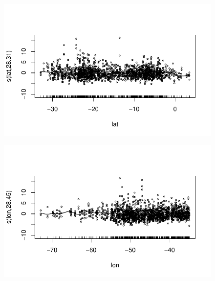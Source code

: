\documentclass[
  letterpaper,
  DIV=11,
  numbers=noendperiod]{scrartcl}
\begin{document}
\begin{figure}[H]

{\centering \includegraphics{Group34Coursework_files/figure-pdf/unnamed-chunk-9-9.pdf}

}

\end{figure}

\begin{figure}[H]

{\centering \includegraphics{Group34Coursework_files/figure-pdf/unnamed-chunk-9-10.pdf}

}

\end{figure}
\end{document}
